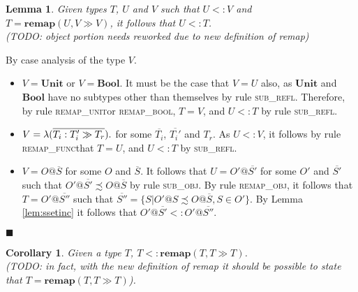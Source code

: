 \documentclass[preprint]{sigplanconf}
\newtheorem{lem}{Lemma}
\newtheorem{cor}{Corollary}
\newcommand{\lemref}[1]{Lemma \ref{#1}}
\newcommand{\subrefl}{\textsc{sub\_refl}}
\newcommand{\subobj}{\textsc{sub\_obj}}
\newcommand{\remapunit}{\textsc{remap\_unit}}
\newcommand{\remapbool}{\textsc{remap\_bool}}
\newcommand{\remapfunc}{\textsc{remap\_func}}
\newcommand{\remapobj}{\textsc{remap\_obj}}
\newcommand{\remapapp}[3]{\ensuremath{\mathbf{remap}(#1, #2 \gg #3)}}
\newcommand{\unitt}{\mathbf{Unit}}
\newcommand{\boolt}{\mathbf{Bool}}
\newcommand{\funv}[4]{\lambda(\overline{#1 : #2 \gg #3}).#4}
\newcommand{\qed}{$\blacksquare$}
\newenvironment{proof}{\vspace{1ex}\noindent{\bf Proof}\hspace{0.5em}}
  {\hfill\qed\vspace{1ex}}
\begin{document}
\begin{lem}
\label{lem:remapeff}
Given types $T$, $U$ and $V$ such that $U <: V$ and $T = \remapapp{U}{V}{V}$, 
it follows that $U <: T$. \\
(TODO: object portion needs reworked due to new definition of remap)
\end{lem}
\begin{proof}
By case analysis of the type $V$.

\begin{itemize}
\item $V = \unitt$ or $V = \boolt$. 
It must be the case that $V = U$ also, as $\unitt$ and $\boolt$
have no subtypes other than themselves by rule \subrefl.
Therefore, by rule \remapunit or \remapbool, $T = V$,
and $U <: T$ by rule \subrefl.

\item $V = \funv{T_i}{T_i'}{T_r}$ for some $\overline{T_i}$, $\overline{T_i'}$
and $T_r$. As $U <: V$, it follows by rule \remapfunc that
$T = U$, and $U <: T$ by \subrefl.

\item $V = O@\overline{S}$ for some $O$ and $\overline{S}$. 
It follows that $U = O'@\overline{S'}$ 
for some $O'$ and $\overline{S'}$ 
such that $O'@\overline{S'} \precsim O@\overline{S}$ 
by rule \subobj. 
By rule \remapobj, it follows that $T = O'@\overline{S''}$ 
such that $\overline{S''} = \{ S | O'@S \precsim O@\overline{S}, S \in O' \}$.
By \lemref{lem:ssetinc} it follows that 
$O'@\overline{S'} <: O'@\overline{S''}$.

\end{itemize}
\end{proof}


\begin{cor}
\label{lem:remapsame}
Given a type $T$, $T <: \remapapp{T}{T}{T}$. \\
(TODO: in fact, with the new definition of remap it should be possible to
state that $T = \remapapp{T}{T}{T}$).
\end{cor}

\end{document}
